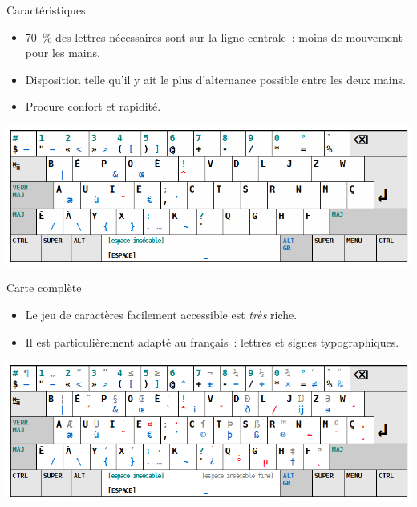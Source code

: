 \begin{frame}{Caractéristiques}

    \begin{itemize}
	\item 70~\% des lettres nécessaires sont sur la ligne centrale~: moins
          de mouvement pour les mains. \pause

        \item Disposition telle qu’il y ait le plus d’alternance possible entre
          les deux mains. \pause

	\item Procure confort et rapidité.
    \end{itemize}
    \pause

    \centering
    \includegraphics[width=\textwidth]{images/bepo-simple.png}
\end{frame}

\begin{frame}{Carte complète}
    \begin{itemize}
        \item Le jeu de caractères facilement accessible est \emph{très}
          riche. \pause

        \item Il est particulièrement adapté au français~: lettres et signes
          typographiques.
    \end{itemize}

    \centering
    \includegraphics[width=\textwidth]{images/bepo-complete.png}
\end{frame}
